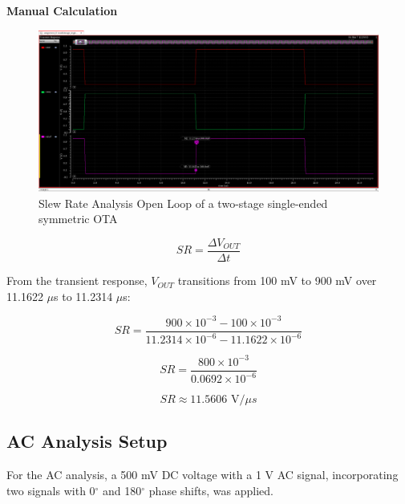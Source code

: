 \textbf{Manual Calculation}


    \begin{figure}[h]
        \centering
           \includegraphics[width=1\textwidth]{images/two_stage_ota_open_slew.png}
        \caption{Slew Rate Analysis Open Loop of a two-stage single-ended symmetric OTA  }
        \label{fig: }
    \end{figure}

\begin{equation}
    SR = \frac{\Delta V_{OUT}}{\Delta t}
\end{equation}

From the transient response, $V_{OUT}$ transitions from 100 mV to 900 mV over 11.1622 $\mu$s to 11.2314 $\mu$s:

\begin{equation}
    SR = \frac{900 \times 10^{-3} - 100 \times 10^{-3}}{11.2314 \times 10^{-6} - 11.1622 \times 10^{-6}}
\end{equation}

\begin{equation}
    SR = \frac{800 \times 10^{-3}}{0.0692 \times 10^{-6}}
\end{equation}

\begin{equation}
    SR \approx 11.5606 \text{ V/} \mu s
\end{equation}


\subsection{AC Analysis Setup}
For the AC analysis, a 500 mV DC voltage with a 1 V AC signal, incorporating two signals with 0$^\circ$ and 180$^\circ$ phase shifts, was applied.


